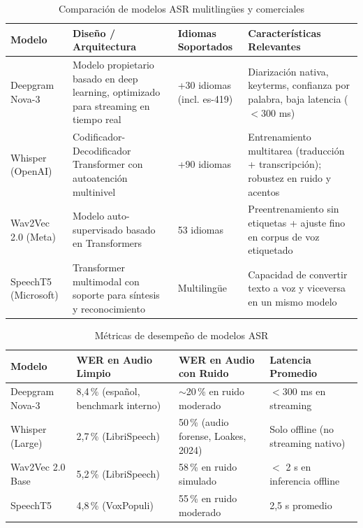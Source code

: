 \documentclass[12pt,a4paper,oneside]{report}
\begin{document}
\begin{table}[H]
\centering
\caption{Comparación de modelos ASR mulitlingües y comerciales}
\begin{tabular}{|p{2.5cm}|p{4cm}|p{2.5cm}|p{3.5cm}|}
\hline
\rowcolor{gray!20}
\textbf{Modelo} & \textbf{Diseño / Arquitectura} & \textbf{Idiomas Soportados} & \textbf{Características Relevantes} \\
\hline
Deepgram Nova-3 & Modelo propietario basado en deep learning, optimizado para streaming en tiempo real & +30 idiomas (incl. es-419) & Diarización nativa, keyterms, confianza por palabra, baja latencia ($< 300$ ms) \\
\hline
Whisper (OpenAI) & Codificador-Decodificador Transformer con autoatención multinivel & +90 idiomas & Entrenamiento multitarea (traducción + transcripción); robustez en ruido y acentos \\
\hline
Wav2Vec 2.0 (Meta) & Modelo auto-supervisado basado en Transformers & 53 idiomas & Preentrenamiento sin etiquetas + ajuste fino en corpus de voz etiquetado \\
\hline
SpeechT5 (Microsoft) & Transformer multimodal con soporte para síntesis y reconocimiento & Multilingüe & Capacidad de convertir texto a voz y viceversa en un mismo modelo \\
\hline
\end{tabular}
\label{tab:transformers}
\end{table}

\begin{table}[H]
\centering
\caption{Métricas de desempeño de modelos ASR}
\begin{tabular}{|p{2.5cm}|p{3.5cm}|p{3.5cm}|p{2.5cm}|}
\hline
\rowcolor{gray!20}
\textbf{Modelo} & \textbf{WER en Audio Limpio} & \textbf{WER en Audio con Ruido} & \textbf{Latencia Promedio} \\
\hline
Deepgram Nova-3 & 8,4\,\% (español, benchmark interno) & $\sim$20\,\% en ruido moderado & $< 300$ ms en streaming \\
\hline
Whisper (Large) & 2,7\,\% (LibriSpeech) & 50\,\% (audio forense, Loakes, 2024) & Solo offline (no streaming nativo) \\
\hline
Wav2Vec 2.0 Base & 5,2\,\% (LibriSpeech) & 58\,\% en ruido simulado & $<$ 2 s en inferencia offline \\
\hline
SpeechT5 & 4,8\,\% (VoxPopuli) & 55\,\% en ruido moderado & 2,5 s promedio \\
\hline
\end{tabular}
\label{tab:metricas_transformers}
\end{table}
\end{document}
